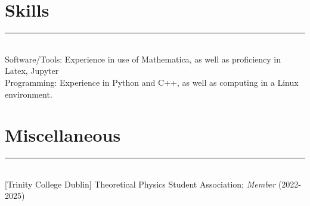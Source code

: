 \documentclass{article}
\begin{document}
\section*{Skills}
\hrule~\\
Software/Tools: Experience in use of Mathematica, as well as proficiency in Latex, Jupyter\\
Programming: Experience in Python and C++, as well as computing in a Linux environment.
\section*{Miscellaneous}
\hrule~\\
$[$Trinity College Dublin$]$ Theoretical Physics Student Association; \textit{Member} (2022-2025)
\end{document}
